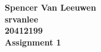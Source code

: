 \documentclass[12pt]{article}
\begin{document}
\begin{center}
{\Large\bf Spencer Van Leeuwen} \\ \vspace{2mm}
{\Large\bf srvanlee} \\ \vspace{2mm}
{\Large\bf 20412199} \\ \vspace{2mm}
{\Large\bf Assignment 1}
\end{center}
\end{document}
